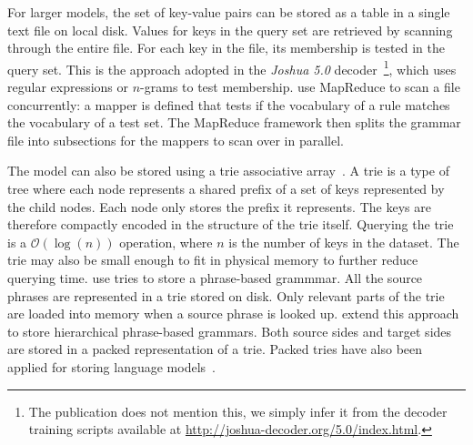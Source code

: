 For larger models, the set of key-value pairs can be stored as a table in a
single text file on local disk. Values for keys in the query set are retrieved
by scanning through the entire file. For each key in the file, its membership is
tested in the query set. This is the approach adopted in the \emph{Joshua 5.0}
decoder~\citep{post-ganitkevitch-orland-weese-cao-callisonburch:2013:WMT}\footnote{The
publication does not mention this, we simply infer it from the decoder training
scripts available at \url{http://joshua-decoder.org/5.0/index.html}.}, which
uses regular expressions or $n$-grams to test membership.
\citet{venugopal-zollmann:2009:PBML} use MapReduce to scan a file concurrently:
a mapper is defined that tests if the vocabulary of a rule matches the
vocabulary of a test set. The MapReduce framework then splits the grammar file
into subsections for the mappers to scan over in parallel.

The model can also be stored using a trie associative
array~\citep{fredkin:1960:ACM}. A trie is a type of tree where each node
represents a shared prefix of a set of keys represented by the child nodes. Each
node only stores the prefix it represents. The keys are therefore compactly
encoded in the structure of the trie itself. Querying the trie is a
$\mathcal{O}(\log(n))$ operation, where $n$ is the number of keys in the
dataset. The trie may also be small enough to fit in physical memory to further
reduce querying time. \citet{zens-ney:2007:HLTNAACL} use tries
to store a phrase-based grammmar. All the source phrases are represented
in a trie stored on disk. Only relevant parts of the trie are loaded into
memory when a source phrase is looked up.
\citet{ganitkevitch-cao-weese-post-callisonburch:2012:WMT} extend this
approach to store hierarchical phrase-based grammars. Both
source sides and target sides are stored in a packed representation of a trie.
Packed tries have also been applied for storing language
models~\citep{pauls-klein:2011:HLTACL,heafield:2011:WMT}.

